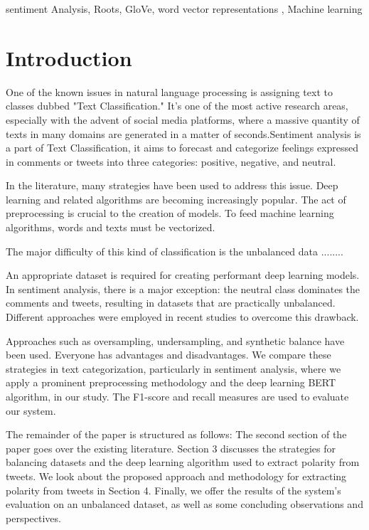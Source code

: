 \documentclass[conference]{IEEEtran}
\begin{document}
\begin{IEEEkeywords}
sentiment Analysis, Roots, GloVe, word vector representations , Machine learning
\end{IEEEkeywords}

\section{Introduction}
One of the known issues in natural language processing is assigning text to classes dubbed "Text Classification."
It's one of the most active research areas, especially with the advent of social media platforms, where a massive quantity of texts in many domains are generated in a matter of seconds.Sentiment analysis is a part of Text Classification, it aims to forecast and categorize feelings expressed in comments or tweets into three categories: positive, negative, and neutral. 

In the literature, many strategies have been used to address this issue. Deep learning and related algorithms are becoming increasingly popular. The act of preprocessing is crucial to the creation of models. To feed machine learning algorithms, words and texts must be vectorized.
 
 The major difficulty of this kind of classification is the unbalanced data ........
 
 
An appropriate dataset is required for creating performant deep learning models. In sentiment analysis, there is a major exception: the neutral class dominates the comments and tweets, resulting in datasets that are practically unbalanced. Different approaches were employed in recent studies to overcome this drawback. 

Approaches such as oversampling, undersampling, and synthetic balance have been used. Everyone has advantages and disadvantages. We compare these strategies in text categorization, particularly in sentiment analysis, where we apply a prominent preprocessing methodology and the deep learning BERT algorithm, in our study. The F1-score and recall measures are used to evaluate our system. 





The remainder of the paper is structured as follows:
The second section of the paper goes over the existing literature.
Section 3 discusses the strategies for balancing datasets and the deep learning algorithm used to extract polarity from tweets.
We look about the proposed approach and methodology for extracting polarity from tweets in Section 4.
Finally, we offer the results of the system's evaluation on an unbalanced dataset, as well as some concluding observations and perspectives. 
\end{document}
